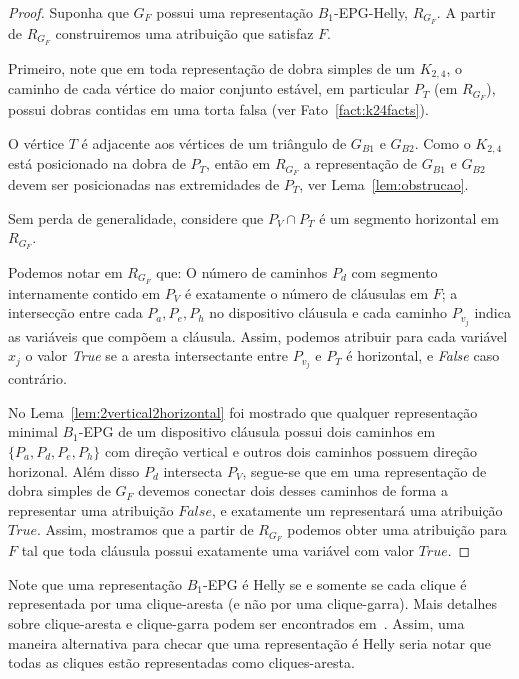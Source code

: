 \begin{proof}
Suponha que $G_F$ possui uma representação $B_1$-EPG-Helly, $R_{G_F}$. A partir de $R_{G_F}$ construiremos uma atribuição que satisfaz $F$. 

Primeiro, note que em toda representação de dobra simples de um $K_{2,4}$, o caminho de cada vértice do maior conjunto estável, em particular $P_{T}$ (em $R_{G_F}$), possui dobras contidas em uma torta falsa (ver Fato~\ref{fact:k24facts}). 


O vértice  $T$ é adjacente aos vértices de um triângulo de  $G_{B1}$ e $G_{B2}$. Como o $K_{2,4}$ está posicionado na dobra de  $P_{T}$, então em $R_{G_F}$ a representação de $G_{B1}$ e $G_{B2}$ devem ser posicionadas nas extremidades de $P_{T}$, ver Lema~\ref{lem:obstrucao}.   


Sem perda de generalidade, considere que $P_{V} \cap P_{T}$ é um segmento horizontal em $R_{G_F}$.

Podemos notar em $R_{G_F}$ que: O número de caminhos $P_{d}$ com segmento internamente contido em  $P_{V}$ é exatamente o número de cláusulas em $F$; a intersecção entre cada  $P_{a}, P_{e}, P_{h}$ no  dispositivo cláusula e cada caminho $P_{v_j}$ indica as variáveis que compõem a cláusula. Assim, podemos atribuir para cada variável $ x_{j}$ o valor \textit{True} se a aresta intersectante entre $P_{v_j}$ e $P_{T}$ é horizontal, e \textit{False} caso contrário. 


No Lema~\ref{lem:2vertical2horizontal} foi mostrado que qualquer representação minimal $B_1$-EPG de um dispositivo cláusula possui dois caminhos em $\{P_{a}, P_{d}, P_{e}, P_{h}\}$ com direção vertical e outros dois caminhos possuem direção horizonal. Além disso $P_{d}$ intersecta $P_{V}$, segue-se que em uma representação de dobra simples de  $G_F$ devemos conectar dois desses caminhos de forma a representar uma atribuição $False$, e exatamente um representará uma atribuição $True$. Assim, mostramos que a partir de $R_{G_F}$ podemos obter uma atribuição para $F$ tal que toda cláusula possui exatamente uma variável com valor $True$.
 \end{proof}


Note que uma representação $B_1$-EPG é  Helly se e somente se cada clique é representada por uma  clique-aresta (e não por uma  clique-garra). Mais detalhes sobre clique-aresta e clique-garra podem ser encontrados em~\cite{golumbic2009}. Assim, uma maneira alternativa para checar que uma representação é Helly seria notar que todas as cliques estão representadas como cliques-aresta.

